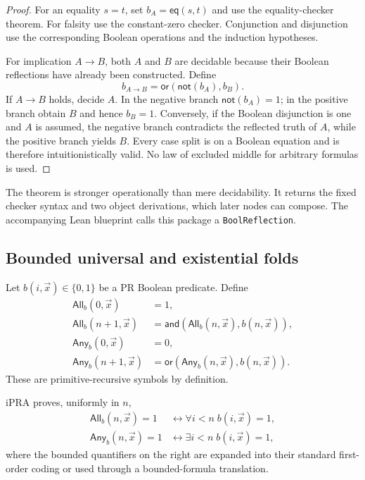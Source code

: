 \begin{proof}
For an equality \(s=t\), set
\(b_A=\mathsf{eq}(s,t)\) and use the equality-checker theorem.  For falsity use
the constant-zero checker.  Conjunction and disjunction use the corresponding
Boolean operations and the induction hypotheses.

For implication \(A\to B\), both \(A\) and \(B\) are decidable because their
Boolean reflections have already been constructed.  Define
\[
 b_{A\to B}=\mathsf{or}(\mathsf{not}(b_A),b_B).
\]
If \(A\to B\) holds, decide \(A\).  In the negative branch
\(\mathsf{not}(b_A)=1\); in the positive branch obtain \(B\) and hence
\(b_B=1\).  Conversely, if the Boolean disjunction is one and \(A\) is
assumed, the negative branch contradicts the reflected truth of \(A\), while
the positive branch yields \(B\).  Every case split is on a Boolean equation
and is therefore intuitionistically valid.  No law of excluded middle for
arbitrary formulas is used.
\end{proof}

The theorem is stronger operationally than mere decidability.  It returns the
fixed checker syntax and two object derivations, which later nodes can compose.
The accompanying Lean blueprint calls this package a
\texttt{BoolReflection}.

\subsection{Bounded universal and existential folds}

Let \(b(i,\vec x)\in\{0,1\}\) be a PR Boolean predicate.  Define
\begin{align*}
 \mathsf{All}_b(0,\vec x)&=1,\\
 \mathsf{All}_b(n+1,\vec x)&=
   \mathsf{and}(\mathsf{All}_b(n,\vec x),b(n,\vec x)),\\[0.3em]
 \mathsf{Any}_b(0,\vec x)&=0,\\
 \mathsf{Any}_b(n+1,\vec x)&=
   \mathsf{or}(\mathsf{Any}_b(n,\vec x),b(n,\vec x)).
\end{align*}
These are primitive-recursive symbols by definition.

\begin{theorem}
\label{thm:bounded-folds}
iPRA proves, uniformly in \(n\),
\begin{align*}
 \mathsf{All}_b(n,\vec x)=1
 &\leftrightarrow \forall i<n\; b(i,\vec x)=1,\\
 \mathsf{Any}_b(n,\vec x)=1
 &\leftrightarrow \exists i<n\; b(i,\vec x)=1,
\end{align*}
where the bounded quantifiers on the right are expanded into their standard
first-order coding or used through a bounded-formula translation.
\end{theorem}

